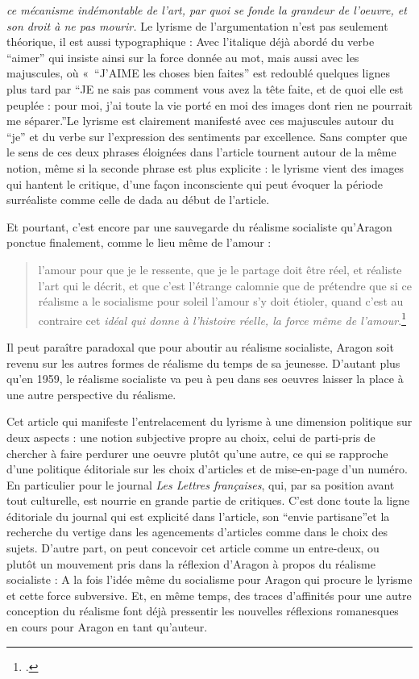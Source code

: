 \emph{ce mécanisme indémontable de l’art, par quoi se fonde la grandeur de l’oeuvre, et son droit à ne pas mourir.} Le lyrisme de l’argumentation n’est pas seulement théorique, il est aussi typographique : Avec l’italique déjà abordé du verbe \enquote{aimer} qui insiste ainsi sur la force donnée au mot, mais aussi avec les majuscules, où « \enquote{J’AIME les choses bien faites} est redoublé quelques lignes plus tard par \enquote{JE ne sais pas comment vous avez la tête faite, et de quoi elle est peuplée : pour moi, j’ai toute la vie porté en moi des images dont rien ne pourrait me séparer.}Le lyrisme est clairement manifesté avec ces majuscules autour du \enquote{je} et du verbe sur l’expression des sentiments par excellence. Sans compter que le sens de ces deux phrases éloignées dans l’article tournent autour de la même notion, même si la seconde phrase est plus explicite : le lyrisme vient des images qui hantent le critique, d’une façon inconsciente qui peut évoquer la période surréaliste comme celle de dada au début de l’article. 

	Et pourtant, c’est encore par une sauvegarde du réalisme socialiste qu’Aragon ponctue finalement, comme le lieu même de l’amour : 
\begin{quote}
  l’amour pour que je le ressente, que je le partage doit  être réel, et réaliste l’art qui le décrit, et que c’est l’étrange calomnie que de prétendre que si ce réalisme a le socialisme pour soleil l’amour s’y doit étioler, quand c’est au contraire cet \emph{idéal qui donne à l’histoire réelle, la force même de l’amour}.\footcite{savoiraimer}\end{quote}


Il peut paraître paradoxal que pour aboutir au réalisme socialiste, Aragon soit revenu sur les autres formes de réalisme du temps de sa jeunesse. D’autant plus qu’en 1959, le réalisme socialiste va peu à peu dans ses oeuvres laisser la place à une autre perspective du réalisme. 

	Cet article qui manifeste l’entrelacement du lyrisme à une dimension politique sur deux aspects : une notion subjective propre au choix, celui de parti-pris de chercher à faire perdurer une oeuvre plutôt qu’une autre, ce qui se rapproche d’une politique éditoriale sur les choix d’articles et de mise-en-page d’un numéro. En particulier pour le journal \emph{Les Lettres françaises}, qui, par sa position avant tout culturelle, est nourrie en grande partie de critiques. C’est donc toute la ligne éditoriale du journal qui est explicité dans l’article, son \enquote{envie partisane}et la recherche du vertige dans les agencements d’articles comme dans le choix des sujets. D’autre part, on peut concevoir cet article comme un entre-deux, ou plutôt un mouvement pris dans la réflexion d’Aragon à propos du réalisme socialiste :  A la fois l’idée même du socialisme  pour Aragon qui procure le lyrisme et cette force subversive. Et, en même temps, des traces d’affinités pour une autre conception du réalisme font déjà pressentir les nouvelles réflexions romanesques en cours pour Aragon en tant qu’auteur. 

